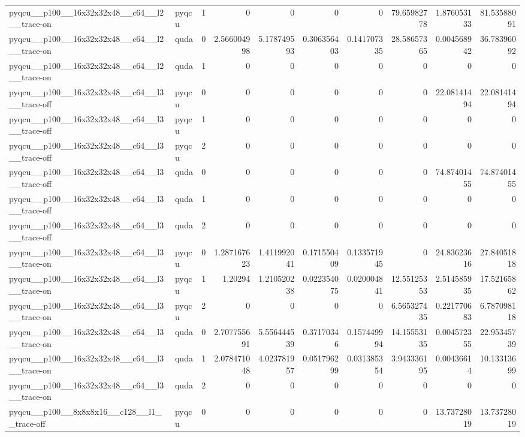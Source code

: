 \begin{table}[htbp]
\begin{tabular}{@{}llrrrrrrrr@{}}
pyqcu\_\_p100\_\_16x32x32x48\_\_c64\_\_l2\_\_trace-on & pyqcu & 1 & 0 & 0 & 0 & 0 & 79.65982778 & 1.876053133 & 81.53588091 \\
pyqcu\_\_p100\_\_16x32x32x48\_\_c64\_\_l2\_\_trace-on & quda & 0 & 2.566004998 & 5.178749593 & 0.306356403 & 0.141707335 & 28.58657365 & 0.004568942 & 36.78396092 \\
pyqcu\_\_p100\_\_16x32x32x48\_\_c64\_\_l2\_\_trace-on & quda & 1 & 0 & 0 & 0 & 0 & 0 & 0 & 0 \\
pyqcu\_\_p100\_\_16x32x32x48\_\_c64\_\_l3\_\_trace-off & pyqcu & 0 & 0 & 0 & 0 & 0 & 0 & 22.08141494 & 22.08141494 \\
pyqcu\_\_p100\_\_16x32x32x48\_\_c64\_\_l3\_\_trace-off & pyqcu & 1 & 0 & 0 & 0 & 0 & 0 & 0 & 0 \\
pyqcu\_\_p100\_\_16x32x32x48\_\_c64\_\_l3\_\_trace-off & pyqcu & 2 & 0 & 0 & 0 & 0 & 0 & 0 & 0 \\
pyqcu\_\_p100\_\_16x32x32x48\_\_c64\_\_l3\_\_trace-off & quda & 0 & 0 & 0 & 0 & 0 & 0 & 74.87401455 & 74.87401455 \\
pyqcu\_\_p100\_\_16x32x32x48\_\_c64\_\_l3\_\_trace-off & quda & 1 & 0 & 0 & 0 & 0 & 0 & 0 & 0 \\
pyqcu\_\_p100\_\_16x32x32x48\_\_c64\_\_l3\_\_trace-off & quda & 2 & 0 & 0 & 0 & 0 & 0 & 0 & 0 \\
pyqcu\_\_p100\_\_16x32x32x48\_\_c64\_\_l3\_\_trace-on & pyqcu & 0 & 1.287167623 & 1.411992041 & 0.171550409 & 0.133571945 & 0 & 24.83623616 & 27.84051818 \\
pyqcu\_\_p100\_\_16x32x32x48\_\_c64\_\_l3\_\_trace-on & pyqcu & 1 & 1.20294 & 1.210520238 & 0.022354075 & 0.020004841 & 12.55125353 & 2.514585935 & 17.52165862 \\
pyqcu\_\_p100\_\_16x32x32x48\_\_c64\_\_l3\_\_trace-on & pyqcu & 2 & 0 & 0 & 0 & 0 & 6.565327435 & 0.221770683 & 6.787098118 \\
pyqcu\_\_p100\_\_16x32x32x48\_\_c64\_\_l3\_\_trace-on & quda & 0 & 2.707755691 & 5.556444539 & 0.37170346 & 0.157449994 & 14.15553135 & 0.004572355 & 22.95345739 \\
pyqcu\_\_p100\_\_16x32x32x48\_\_c64\_\_l3\_\_trace-on & quda & 1 & 2.078471048 & 4.023781957 & 0.051796299 & 0.031385354 & 3.943336195 & 0.00436614 & 10.13313699 \\
pyqcu\_\_p100\_\_16x32x32x48\_\_c64\_\_l3\_\_trace-on & quda & 2 & 0 & 0 & 0 & 0 & 0 & 0 & 0 \\
pyqcu\_\_p100\_\_8x8x8x16\_\_c128\_\_l1\_\_trace-off & pyqcu & 0 & 0 & 0 & 0 & 0 & 0 & 13.73728019 & 13.73728019 \\

\end{tabular}
\end{table}
